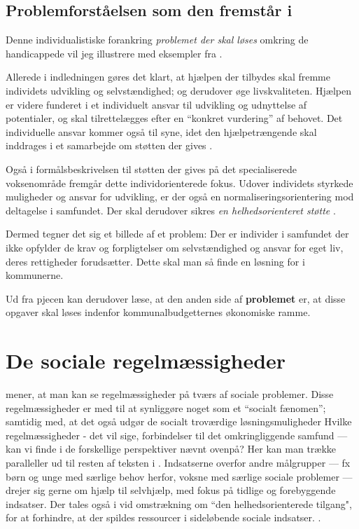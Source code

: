 \subsection{Problemforståelsen som den fremstår i }

 Denne individualistiske forankring \textit{problemet der skal løses} omkring de handicappede vil jeg illustrere med eksempler fra .

Allerede i indledningen gøres det klart, at hjælpen der tilbydes skal fremme individets udvikling og selvstændighed; og derudover øge livskvaliteten.
Hjælpen er videre funderet i et individuelt ansvar til udvikling og udnyttelse af potentialer, og skal tilrettelægges efter en “konkret vurdering” af behovet.
Det individuelle ansvar kommer også til syne, idet den hjælpetrængende skal inddrages i et samarbejde om støtten der gives \autocite[§§ 2-3]{social-ogindenrigsministerietBekendtgorelseAfLov2019}.

Også i formålsbeskrivelsen til støtten der gives på det specialiserede voksenområde fremgår  dette individorienterede fokus.
Udover individets styrkede muligheder og ansvar for udvikling, er der også en normaliseringsorientering mod deltagelse i samfundet.
Der skal derudover sikres \textit{en helhedsorienteret støtte} \autocite[§ 81]{social-ogindenrigsministerietBekendtgorelseAfLov2019}.

Dermed tegner det sig et billede af et problem: Der er individer i samfundet der ikke opfylder de krav og forpligtelser om selvstændighed og ansvar for eget liv, deres rettigheder forudsætter. Dette skal man så finde en løsning for i kommunerne.

Ud fra pjecen kan derudover læse, at den anden side af \textbf{problemet} er, at disse opgaver skal løses indenfor kommunalbudgetternes økonomiske ramme.

\section{De sociale regelmæssigheder}

\citeauthor{scheurichPolicyArchaeologyNew1994} mener, at man kan se regelmæssigheder på tværs af sociale problemer.
Disse regelmæssigheder er med til at synliggøre noget som et “socialt fænomen”; samtidig med, at det også udgør de socialt troværdige løsningsmuligheder \autocite[s. 301]{scheurichPolicyArchaeologyNew1994}
Hvilke regelmæssigheder - det vil sige, forbindelser til det omkringliggende samfund — kan vi finde i de forskellige perspektiver nævnt ovenpå?
Her kan man trække paralleller ud til resten af teksten i  .
Indsatserne overfor andre målgrupper — fx børn og unge med særlige behov herfor, voksne med særlige sociale problemer — drejer sig gerne om hjælp til selvhjælp, med fokus på tidlige og forebyggende indsatser. Der tales også i vid omstrækning om “den helhedsorienterede tilgang", for at forhindre, at der spildes ressourcer i sideløbende sociale indsatser. \autocite[Kap. 6, 15]{social-ogindenrigsministerietBekendtgorelseAfLov2019}.

